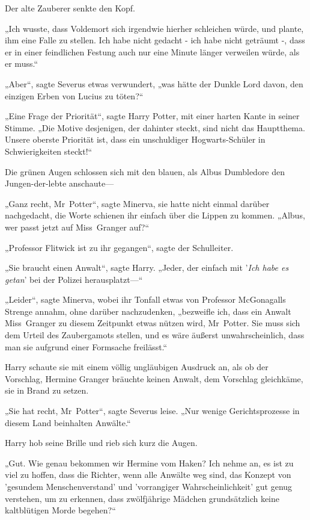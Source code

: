 {Der alte Zauberer senkte den Kopf.

„Ich wusste, dass Voldemort sich irgendwie hierher schleichen würde, und plante, ihm eine Falle zu stellen. Ich habe nicht gedacht - ich habe nicht geträumt -, dass er in einer feindlichen Festung auch nur eine Minute länger verweilen würde, als er muss.“

„Aber“, sagte Severus etwas verwundert, „was hätte der Dunkle Lord davon, den einzigen Erben von Lucius zu töten?“

„Eine Frage der Priorität“, sagte Harry Potter, mit einer harten Kante in seiner Stimme. „Die Motive desjenigen, der dahinter steckt, sind nicht das Hauptthema. Unsere oberste Priorität ist, dass ein unschuldiger Hogwarts-Schüler in Schwierigkeiten steckt!“

Die grünen Augen schlossen sich mit den blauen, als Albus Dumbledore den Jungen-der-lebte anschaute—

„Ganz recht, Mr~Potter“, sagte Minerva, sie hatte nicht einmal darüber nachgedacht, die Worte schienen ihr einfach über die Lippen zu kommen. „Albus, wer passt jetzt auf Miss~Granger auf?“

„Professor Flitwick ist zu ihr gegangen“, sagte der Schulleiter.

„Sie braucht einen Anwalt“, sagte Harry. „Jeder, der einfach mit '\emph{Ich habe es getan}' bei der Polizei herausplatzt—“

„Leider“, sagte Minerva, wobei ihr Tonfall etwas von Professor McGonagalls Strenge annahm, ohne darüber nachzudenken, „bezweifle ich, dass ein Anwalt Miss~Granger zu diesem Zeitpunkt etwas nützen wird, Mr~Potter. Sie muss sich dem Urteil des Zaubergamots stellen, und es wäre äußerst unwahrscheinlich, dass man sie aufgrund einer Formsache freilässt.“

Harry schaute sie mit einem völlig ungläubigen Ausdruck an, als ob der Vorschlag, Hermine Granger bräuchte keinen Anwalt, dem Vorschlag gleichkäme, sie in Brand zu setzen.

„Sie hat recht, Mr~Potter“, sagte Severus leise. „Nur wenige Gerichtsprozesse in diesem Land beinhalten Anwälte.“

Harry hob seine Brille und rieb sich kurz die Augen.

„Gut. Wie genau bekommen wir Hermine vom Haken? Ich nehme an, es ist zu viel zu hoffen, dass die Richter, wenn alle Anwälte weg sind, das Konzept von 'gesundem Menschenverstand' und 'vorrangiger Wahrscheinlichkeit' gut genug verstehen, um zu erkennen, dass zwölfjährige Mädchen grundsätzlich keine kaltblütigen Morde begehen?“

}
